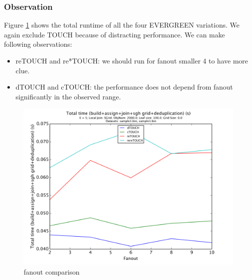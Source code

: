 \documentclass{sig-alternate}
\newcommand{\fref}[1]{Figure \ref{#1}}
\newcommand{\SJ}{TOUCH}
\newcommand{\newSJ}{EVERGREEN}
\newcommand{\dSJ}{dTOUCH}
\newcommand{\cSJ}{cTOUCH}
\newcommand{\reSJ}{reTOUCH}
\newcommand{\rereSJ}{re*TOUCH}
\begin{document}
\subsubsection{Observation}
\fref{fig:fanout:time} shows the total runtime of all the four {\newSJ} variations. We again exclude {\SJ} because of distracting performance. We can make following observations: 

\begin{itemize}
\item {\reSJ} and {\rereSJ}: we should run for fanout smaller 4 to have more clue.
\item {\dSJ} and {\cSJ}: the performance does not depend from fanout significantly in the observed range.
\end{itemize}

\begin{figure}[htb]
    \begin{center}
        \includegraphics[width=\columnwidth]{fanout/total}
        \caption{fanout comparison}
        \label{fig:fanout:time}
      \end{center}
\end{figure}
\end{document}
